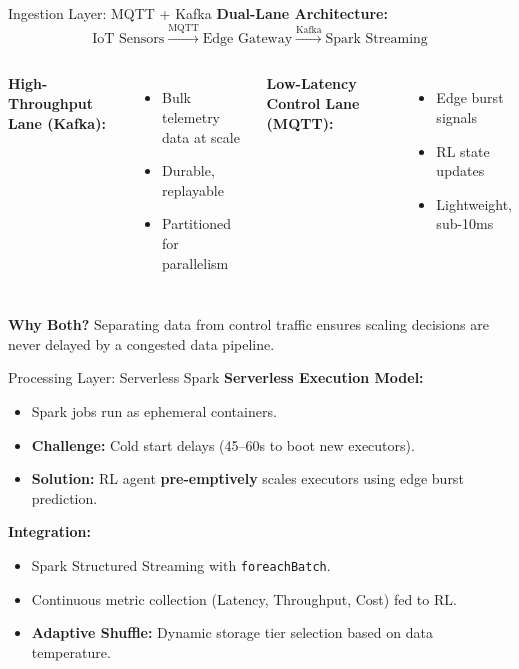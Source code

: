 \documentclass{beamer}
\begin{document}
\begin{frame}{Ingestion Layer: MQTT + Kafka}
\textbf{Dual-Lane Architecture:}
\[ \text{IoT Sensors} \xrightarrow{\text{MQTT}} \text{Edge Gateway} \xrightarrow{\text{Kafka}} \text{Spark Streaming} \]

\vspace{0.2cm}
\begin{columns}
\textbf{High-Throughput Lane (Kafka):}
\begin{itemize}
    \item Bulk telemetry data at scale
    \item Durable, replayable
    \item Partitioned for parallelism
\end{itemize}

\textbf{Low-Latency Control Lane (MQTT):}
\begin{itemize}
    \item Edge burst signals
    \item RL state updates
    \item Lightweight, sub-10ms
\end{itemize}
\end{columns}
\vspace{0.3cm}
\textbf{Why Both?} Separating data from control traffic ensures scaling decisions are never delayed by a congested data pipeline.
\end{frame}

\begin{frame}{Processing Layer: Serverless Spark}
\textbf{Serverless Execution Model:}
\begin{itemize}
    \item Spark jobs run as ephemeral containers.
    \item \textbf{Challenge:} Cold start delays (45--60s to boot new executors).
    \item \textbf{Solution:} RL agent \textbf{pre-emptively} scales executors using edge burst prediction.
\end{itemize}
\vspace{0.3cm}
\textbf{Integration:}
\begin{itemize}
    \item Spark Structured Streaming with \texttt{foreachBatch}.
    \item Continuous metric collection (Latency, Throughput, Cost) fed to RL.
    \item \textbf{Adaptive Shuffle:} Dynamic storage tier selection based on data temperature.
\end{itemize}
\end{frame}
\end{document}
